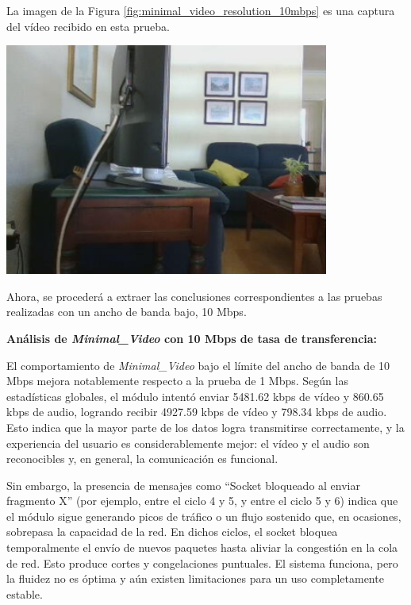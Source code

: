 La imagen de la Figura \ref{fig:minimal_video_resolution_10mbps} es una captura del vídeo recibido en esta prueba.
\begin{center}
  \includegraphics[width = 0.8\textwidth]{images/VideoRecibido2.3.png}
  \label{fig:minimal_video_resolution_10mbps}
\end{center}
\newpage

Ahora, se procederá a extraer las conclusiones correspondientes a las pruebas realizadas con un ancho de banda bajo, 10 Mbps.
\vspace{\baselineskip}

\textbf{Análisis de \textit{Minimal\_Video} con 10 Mbps de tasa de transferencia:}
\vspace{\baselineskip}

El comportamiento de \textit{Minimal\_Video} bajo el límite del ancho de banda de 10 Mbps mejora notablemente respecto a la prueba de 1 Mbps. Según las estadísticas globales, el módulo intentó enviar 5481.62 kbps de vídeo y 860.65 kbps de audio, logrando recibir 4927.59 kbps de vídeo y 798.34 kbps de audio. Esto indica que la mayor parte de los datos logra transmitirse correctamente, y la experiencia del usuario es considerablemente mejor: el vídeo y el audio son reconocibles y, en general, la comunicación es funcional.
\vspace{\baselineskip}

Sin embargo, la presencia de mensajes como ``Socket bloqueado al enviar fragmento X'' (por ejemplo, entre el ciclo 4 y 5, y entre el ciclo 5 y 6) indica que el módulo sigue generando picos de tráfico o un flujo sostenido que, en ocasiones, sobrepasa la capacidad de la red. En dichos ciclos, el socket bloquea temporalmente el envío de nuevos paquetes hasta aliviar la congestión en la cola de red. Esto produce cortes y congelaciones puntuales. El sistema funciona, pero la fluidez no es óptima y aún existen limitaciones para un uso completamente estable.


